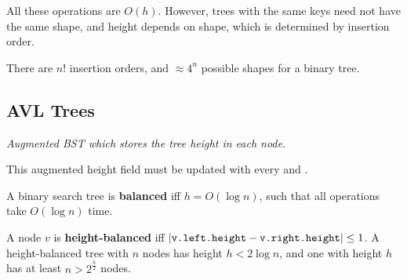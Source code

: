 All these operations are $O(h)$.
However, trees with the same keys need not have the same shape, and height depends on shape,
which is determined by insertion order.

There are $n!$ insertion orders, and $\approx 4^n$ possible shapes for a binary tree.

\subsection{AVL Trees}
\emph{Augmented BST which stores the tree height in each node.}

This augmented height field must be updated with every  and .

A binary search tree is \textbf{balanced} iff $h = O(\log n)$, such that all operations take $O(\log n)$ time.

A node $v$ is \textbf{height-balanced} iff $|\texttt{v.left.height} - \texttt{v.right.height}| \leq 1$.
A height-balanced tree with $n$ nodes has height $h < 2 \log n$, and one with height $h$ has at least $n > 2^\frac{h}{2}$ nodes.

